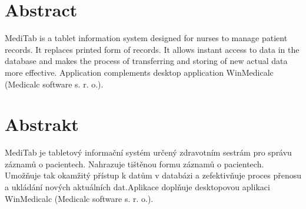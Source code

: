 \section*{Abstract}
MediTab is a tablet information system designed for nurses to manage patient records. It replaces printed form of records. It allows instant access to data in the database and makes the process of transferring and storing of new actual data more effective. Application complements desktop application WinMedicalc (Medicalc software s. r. o.).

\vfill

\section*{Abstrakt}
MediTab je tabletový informační systém určený zdravotním sestrám pro správu záznamů o pacientech. Nahrazuje tištěnou formu záznamů o pacientech. Umožňuje tak okamžitý přístup k datům v databázi a zefektivňuje proces přenosu a ukládání nových aktuálních dat.Aplikace doplňuje desktopovou aplikaci WinMedicalc (Medicalc software s. r. o.).

\vfill